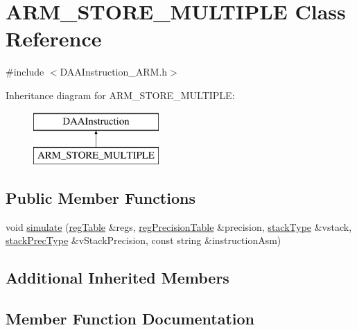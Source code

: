 \hypertarget{classARM__STORE__MULTIPLE}{}\section{A\+R\+M\+\_\+\+S\+T\+O\+R\+E\+\_\+\+M\+U\+L\+T\+I\+P\+LE Class Reference}
\label{classARM__STORE__MULTIPLE}


{\ttfamily \#include $<$D\+A\+A\+Instruction\+\_\+\+A\+R\+M.\+h$>$}

Inheritance diagram for A\+R\+M\+\_\+\+S\+T\+O\+R\+E\+\_\+\+M\+U\+L\+T\+I\+P\+LE\+:\begin{figure}[H]
\begin{center}
\leavevmode
\includegraphics[height=2.000000cm]{classARM__STORE__MULTIPLE}
\end{center}
\end{figure}
\subsection*{Public Member Functions}
\begin{DoxyCompactItemize}
\item 
void \hyperlink{classARM__STORE__MULTIPLE_a93baf296893b2f7f596b057ffb229f09}{simulate} (\hyperlink{DAAInstruction_8h_af0fae93a861de9cf37988d5673cac523}{reg\+Table} \&regs, \hyperlink{DAAInstruction_8h_a0e8cae02815a5f8adc750122d790b455}{reg\+Precision\+Table} \&precision, \hyperlink{DAAInstruction_8h_a1b0e70ac1a04f06c8132055ed01f589f}{stack\+Type} \&vstack, \hyperlink{DAAInstruction_8h_ac5cb793e9dac3fa9693da78b7e29ab30}{stack\+Prec\+Type} \&v\+Stack\+Precision, const string \&instruction\+Asm)
\end{DoxyCompactItemize}
\subsection*{Additional Inherited Members}


\subsection{Member Function Documentation}
\mbox{\label{classARM__STORE__MULTIPLE_a93baf296893b2f7f596b057ffb229f09}} 
